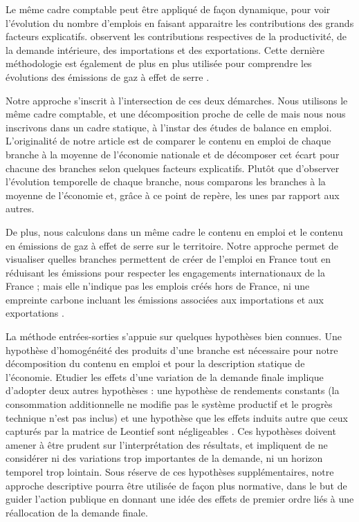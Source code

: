 Le même cadre comptable peut être appliqué de façon dynamique, pour voir l’évolution du nombre d’emplois en faisant apparaitre les contributions des grands facteurs explicatifs. \citet{Barlet2009} observent les contributions respectives de la productivité, de la demande intérieure, des importations et des exportations. Cette dernière méthodologie est également de plus en plus utilisée pour comprendre les évolutions des émissions de gaz à effet de serre \citep{Martin2014a}.

Notre approche s’inscrit à l’intersection de ces deux démarches. Nous utilisons le même cadre comptable, et une décomposition proche de celle de \citet{Barlet2009} mais nous nous inscrivons dans un cadre statique, à l’instar des études de balance en emploi. L’originalité de notre article est de comparer le contenu en emploi de chaque branche à la moyenne de l’économie nationale et de décomposer cet écart pour chacune des branches selon quelques facteurs explicatifs. Plutôt que d’observer l’évolution temporelle de chaque branche, nous comparons les branches à la moyenne de l’économie et, grâce à ce point de repère, les unes par rapport aux autres. 

De plus, nous calculons dans un même cadre le contenu en emploi et le contenu en émissions de gaz à effet de serre sur le territoire. Notre approche permet de visualiser quelles branches permettent de créer de l’emploi en France tout en réduisant les émissions pour respecter les engagements internationaux de la France ; mais elle n’indique pas les emplois créés hors de France, ni une empreinte carbone incluant les émissions associées aux importations et aux exportations \citep{Pasquier2012}.

La méthode entrées-sorties s'appuie sur quelques hypothèses bien connues. Une hypothèse d’homogénéité des produits d’une branche est nécessaire pour notre décomposition du contenu en emploi et pour la description statique de l’économie. Etudier les effets d’une variation de la demande finale implique d’adopter deux autres hypothèses : une hypothèse de rendements constants (la consommation additionnelle ne modifie pas le système productif et le progrès technique n'est pas inclus) et une hypothèse que les effets induits autre que ceux capturés par la matrice de Leontief sont négligeables \citep{Freyssinet1977}. Ces hypothèses doivent amener à être prudent sur l’interprétation des résultats, et impliquent de ne considérer ni des variations trop importantes de la demande, ni un horizon temporel trop lointain.
Sous réserve de ces hypothèses supplémentaires, notre approche descriptive pourra être utilisée de façon plus normative, dans le but de guider l’action publique en donnant une idée des effets de premier ordre liés à une réallocation de la demande finale.


